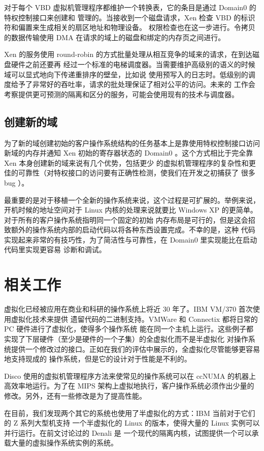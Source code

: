 对于每个 VBD 虚拟机管理程序都维护一个转换表，它的条目是通过 Domain0 的特权控制接口来创建和
管理的。当接收到一个磁盘请求，Xen 检查 VBD 的标识符和偏置来生成相关的扇区地址和物理设备。
权限检查也在这一步进行。令拷贝的数据传输使用 DMA 在请求的域上的磁盘和绑定的内存页之间进行。

Xen 的服务使用 round-robin 的方式批量处理从相互竞争的域来的请求，在到达磁盘硬件之前还要再
经过一个标准的电梯调度器。当需要维护高级别的语义的时候域可以显式地向下传递重排序的壁垒，比如说
使用预写入的日志时。低级别的调度给予了非常好的吞吐率，请求的批处理保证了相对公平的访问。未来的
工作会考察提供更可预测的隔离和区分的服务，可能会使用现有的技术与调度器。

\subsection{创建新的域}

为了新的域创建初始的客户操作系统结构的任务基本上是靠使用特权控制接口访问新域的内存并通知 Xen
初始的寄存器状态的 Domain0 。这个方式相比于完全靠 Xen 本身创建新的域来说有几个优势，包括更少
的虚拟机管理程序的复杂性和更佳的可靠性（对特权接口的访问要有正确性检测，使我们在开发之初捕获了
很多 bug ）。

最重要的是对于移植一个全新的操作系统来说，这个过程是可扩展的。举例来说，开机时候的地址空间对于
Linux 内核的处理来说就要比 Windows XP 的更简单。对于所有的客户操作系统指明同一个固定的初始
内存布局是可行的，但是这会招致额外的操作系统内部的启动代码以将各种东西设置完成。不幸的是，这种
代码实现起来非常的有技巧性，为了简洁性与可靠性，在 Domain0 里实现能比在启动代码里实现更容易
诊断和调试。

\section{相关工作}

虚拟化已经被应用在商业和科研的操作系统上将近 30 年了。IBM VM/370 首次使用虚拟化技术来提供
遗留代码的二进制支持。VMWare 和 Connectix 都将日常的 PC 硬件进行了虚拟化，使得多个操作系统
能在同一个主机上运行。这些例子都实现了下层硬件（至少是硬件的一个子集）的全虚拟化而不是半虚拟化
对操作系统提供一个修改过的接口。正如在我们的评估中展示的，全虚拟化尽管能够更容易地支持现成的
操作系统，但是它的设计对于性能是不利的。

Disco 使用的虚拟机管理程序方法来使常见的操作系统可以在 ccNUMA 的机器上高效率地运行。为了在
MIPS 架构上虚拟地执行，客户操作系统必须作出少量的修改。另外，还有一些修改是为了提高性能。

在目前，我们发现两个其它的系统也使用了半虚拟化的方式：IBM 当前对于它们的 Z 系列大型机支持
一个半虚拟化的 Linux 的版本，使得大量的 Linux 实例可以并行运行。在前文讨论过的 Denali 是
一个现代的隔离内核，试图提供一个可以承载大量的虚拟操作系统实例的系统。

